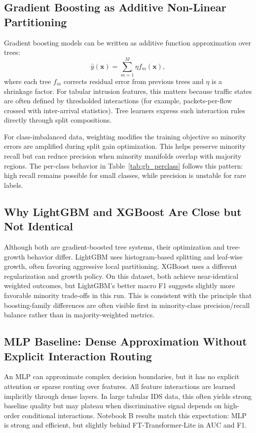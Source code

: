 \documentclass[10pt,journal]{IEEEtran}
\begin{document}
\subsection{Gradient Boosting as Additive Non-Linear Partitioning}
Gradient boosting models can be written as additive function approximation over trees:
\begin{equation}
\hat{y}(\mathbf{x}) = \sum_{m=1}^{M}\eta f_m(\mathbf{x}),
\end{equation}
where each tree $f_m$ corrects residual error from previous trees and $\eta$ is a shrinkage factor. For tabular intrusion features, this matters because traffic states are often defined by thresholded interactions (for example, packets-per-flow crossed with inter-arrival statistics). Tree learners express such interaction rules directly through split compositions.

For class-imbalanced data, weighting modifies the training objective so minority errors are amplified during split gain optimization. This helps preserve minority recall but can reduce precision when minority manifolds overlap with majority regions. The per-class behavior in Table~\ref{tab:gb_perclass} follows this pattern: high recall remains possible for small classes, while precision is unstable for rare labels.

\subsection{Why LightGBM and XGBoost Are Close but Not Identical}
Although both are gradient-boosted tree systems, their optimization and tree-growth behavior differ. LightGBM uses histogram-based splitting and leaf-wise growth, often favoring aggressive local partitioning. XGBoost uses a different regularization and growth policy. On this dataset, both achieve near-identical weighted outcomes, but LightGBM's better macro F1 suggests slightly more favorable minority trade-offs in this run. This is consistent with the principle that boosting-family differences are often visible first in minority-class precision/recall balance rather than in majority-weighted metrics.

\subsection{MLP Baseline: Dense Approximation Without Explicit Interaction Routing}
An MLP can approximate complex decision boundaries, but it has no explicit attention or sparse routing over features. All feature interactions are learned implicitly through dense layers. In large tabular IDS data, this often yields strong baseline quality but may plateau when discriminative signal depends on high-order conditional interactions. Notebook B results match this expectation: MLP is strong and efficient, but slightly behind FT-Transformer-Lite in AUC and F1.
\end{document}
